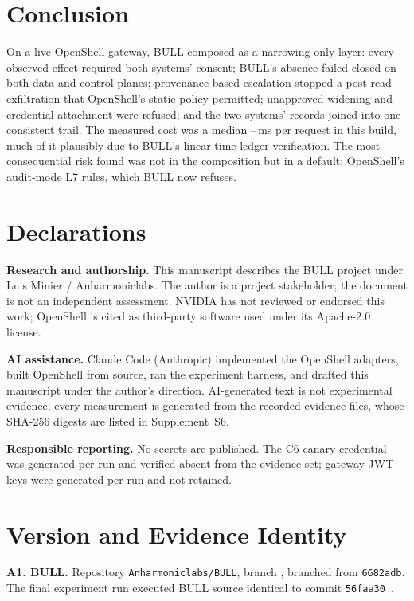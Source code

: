 \documentclass[journal]{IEEEtran}
\newcommand{\bull}{\textsc{BULL}}
\newcommand{\openshell}{OpenShell}
\newcommand{\expshort}{\texttt{56faa30}}
\newcommand{\baseshort}{\texttt{6682adb}}
\begin{document}
\section{Conclusion}
On a live \openshell{} \osVersion{} gateway, \bull{} composed as a narrowing-only layer: every observed effect required both systems' consent; \bull{}'s absence failed closed on both data and control planes; provenance-based escalation stopped a post-read exfiltration that \openshell{}'s static policy permitted; unapproved widening and credential attachment were refused; and the two systems' records joined into one consistent trail. The measured cost was a median \deltaGet{}--\deltaPost{}\,ms per request in this build, much of it plausibly due to \bull{}'s linear-time ledger verification. The most consequential risk found was not in the composition but in a default: \openshell{}'s audit-mode L7 rules, which \bull{} now refuses.

\section*{Declarations}
\textbf{Research and authorship.} This manuscript describes the \bull{} project under Luis Minier / Anharmoniclabs. The author is a project stakeholder; the document is not an independent assessment. NVIDIA has not reviewed or endorsed this work; \openshell{} is cited as third-party software used under its Apache-2.0 license.

\textbf{AI assistance.} Claude Code (Anthropic) implemented the \openshell{} adapters, built \openshell{} from source, ran the experiment harness, and drafted this manuscript under the author's direction. AI-generated text is not experimental evidence; every measurement is generated from the recorded evidence files, whose SHA-256 digests are listed in Supplement~S6.

\textbf{Responsible reporting.} No secrets are published. The C6 canary credential was generated per run and verified absent from the evidence set; gateway JWT keys were generated per run and not retained.

\appendices

\section{Version and Evidence Identity}
\textbf{A1. \bull{}.} Repository \texttt{Anharmoniclabs/BULL}, branch , branched from \baseshort{}. The final experiment run executed \bull{} source identical to commit \expshort{}~\cite{BULL_Branch}.
\end{document}
